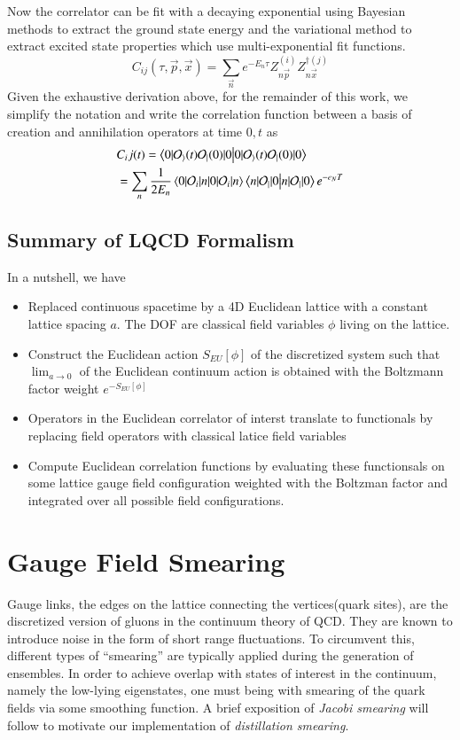 Now the correlator can be fit with a decaying exponential using Bayesian methods to extract the ground state energy and the variational method to extract excited state properties which use multi-exponential fit functions. 
\begin{equation}
    C_{ij}(\tau,\vec{p},\vec{x}) = \sum_{\vec{n}}^{} e^{-E_n\tau} Z_{n\vec{p}}^{(i)} Z_{n\vec{x}}^{\dagger(j)}
\end{equation}
Given the exhaustive derivation above, for the remainder of this work, we simplify the notation and write the correlation function between a basis of creation and annihilation operators at time $0,t$ as \cite{Dudek_2010}
\begin{align}
    &C_ij(t) = \braket{0|\mathcal{O_i}(t)\mathcal{O_j}(0)|0} \\
    &= \sum_{n}^{} \frac{1}{2E_n}\braket{0|\mathcal{O}_i|n}\braket{n|\mathcal{O_j}|0}e^{-e_NT}    
\end{align}

\subsection{Summary of LQCD Formalism}
In a nutshell, we have 
\begin{itemize}
    \item Replaced continuous spacetime by a 4D Euclidean lattice with a constant lattice spacing $a$. The DOF are classical field variables $\phi$ living on the lattice.
    \item Construct the Euclidean action $S_{EU}[\phi]$ of the discretized system such that $\lim_{a \to 0}$ of the Euclidean continuum action is obtained with the Boltzmann factor weight $e^{-S_{EU}[\phi]}$ 
    \item Operators in the Euclidean correlator of interst translate to functionals by replacing field operators with classical latice field variables 
    \item Compute Euclidean correlation functions by evaluating these functionsals on some lattice gauge field configuration weighted with the Boltzman factor and integrated over all possible field configurations.
\end{itemize}

\section{Gauge Field Smearing}
Gauge links, the edges on the lattice connecting the vertices(quark sites), are the discretized version of gluons in the continuum theory of QCD. They are known to introduce noise in the form of short range fluctuations. To circumvent this, different types of ``smearing'' are typically applied during the generation of ensembles. In order to achieve overlap with states of interest in the continuum, namely the low-lying eigenstates, one must being with smearing of the quark fields via some smoothing function. A brief exposition of \textit{Jacobi smearing} will follow to motivate our implementation of \textit{distillation smearing}.

